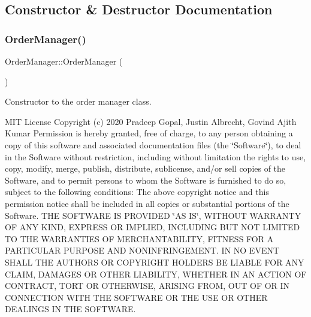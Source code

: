 \subsection{Constructor \& Destructor Documentation}
\mbox{\label{class_order_manager_a77db3965911e31246416250711899633}} 
\subsubsection{\texorpdfstring{Order\+Manager()}{OrderManager()}}
{\footnotesize\ttfamily Order\+Manager\+::\+Order\+Manager (\begin{DoxyParamCaption}{ }\end{DoxyParamCaption})}



Constructor to the order manager class. 

M\+IT License Copyright (c) 2020 Pradeep Gopal, Justin Albrecht, Govind Ajith Kumar Permission is hereby granted, free of charge, to any person obtaining a copy of this software and associated documentation files (the \char`\"{}\+Software\char`\"{}), to deal in the Software without restriction, including without limitation the rights to use, copy, modify, merge, publish, distribute, sublicense, and/or sell copies of the Software, and to permit persons to whom the Software is furnished to do so, subject to the following conditions\+: The above copyright notice and this permission notice shall be included in all copies or substantial portions of the Software. T\+HE S\+O\+F\+T\+W\+A\+RE IS P\+R\+O\+V\+I\+D\+ED \char`\"{}\+A\+S I\+S\char`\"{}, W\+I\+T\+H\+O\+UT W\+A\+R\+R\+A\+N\+TY OF A\+NY K\+I\+ND, E\+X\+P\+R\+E\+SS OR I\+M\+P\+L\+I\+ED, I\+N\+C\+L\+U\+D\+I\+NG B\+UT N\+OT L\+I\+M\+I\+T\+ED TO T\+HE W\+A\+R\+R\+A\+N\+T\+I\+ES OF M\+E\+R\+C\+H\+A\+N\+T\+A\+B\+I\+L\+I\+TY, F\+I\+T\+N\+E\+SS F\+OR A P\+A\+R\+T\+I\+C\+U\+L\+AR P\+U\+R\+P\+O\+SE A\+ND N\+O\+N\+I\+N\+F\+R\+I\+N\+G\+E\+M\+E\+NT. IN NO E\+V\+E\+NT S\+H\+A\+LL T\+HE A\+U\+T\+H\+O\+RS OR C\+O\+P\+Y\+R\+I\+G\+HT H\+O\+L\+D\+E\+RS BE L\+I\+A\+B\+LE F\+OR A\+NY C\+L\+A\+IM, D\+A\+M\+A\+G\+ES OR O\+T\+H\+ER L\+I\+A\+B\+I\+L\+I\+TY, W\+H\+E\+T\+H\+ER IN AN A\+C\+T\+I\+ON OF C\+O\+N\+T\+R\+A\+CT, T\+O\+RT OR O\+T\+H\+E\+R\+W\+I\+SE, A\+R\+I\+S\+I\+NG F\+R\+OM, O\+UT OF OR IN C\+O\+N\+N\+E\+C\+T\+I\+ON W\+I\+TH T\+HE S\+O\+F\+T\+W\+A\+RE OR T\+HE U\+SE OR O\+T\+H\+ER D\+E\+A\+L\+I\+N\+GS IN T\+HE S\+O\+F\+T\+W\+A\+RE. 

